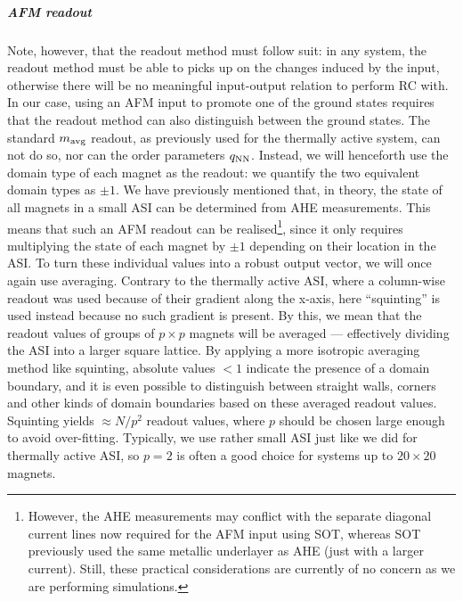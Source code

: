\subparagraph{AFM readout}
Note, however, that the readout method must follow suit: in any system, the readout method must be able to picks up on the changes induced by the input, otherwise there will be no meaningful input-output relation to perform RC with.
In our case, using an AFM input to promote one of the ground states requires that the readout method can also distinguish between the ground states.
The standard $m_\mathrm{avg}$ readout, as previously used for the thermally active system, can not do so, nor can the order parameters $q_\mathrm{NN}$.
Instead, we will henceforth use the domain type of each magnet as the readout: we quantify the two equivalent domain types as $\pm 1$.
We have previously mentioned that, in theory, the state of all magnets in a small ASI can be determined from AHE measurements.
This means that such an AFM readout can be realised\footnote{
	However, the AHE measurements may conflict with the separate diagonal current lines now required for the AFM input using SOT, whereas SOT previously used the same metallic underlayer as AHE (just with a larger current).
	Still, these practical considerations are currently of no concern as we are performing simulations.
}, since it only requires multiplying the state of each magnet by $\pm 1$ depending on their location in the ASI.
To turn these individual values into a robust output vector, we will once again use averaging.
Contrary to the thermally active ASI, where a column-wise readout was used because of their gradient along the x-axis, here ``squinting'' is used instead because no such gradient is present.
By this, we mean that the readout values of groups of $p \times p$ magnets will be averaged --- effectively dividing the ASI into a larger square lattice.
By applying a more isotropic averaging method like squinting, absolute values $<1$ indicate the presence of a domain boundary,
and it is even possible to distinguish between straight walls, corners and other kinds of domain boundaries based on these averaged readout values.
Squinting yields $\approx N/p^2$ readout values, where $p$ should be chosen large enough to avoid over-fitting.
Typically, we use rather small ASI just like we did for thermally active ASI, so $p=2$ is often a good choice for systems up to $20 \times 20$ magnets.



